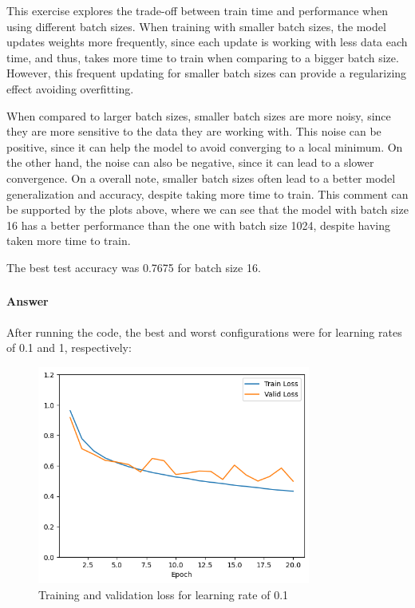 \documentclass{article}
\begin{document}
This exercise explores the trade-off between train time and performance when using different batch sizes. When training with smaller batch sizes, 
the model updates weights more frequently, since each update is working with less data each time, and thus, takes more time to train 
when comparing to a bigger batch size. However, this frequent updating for smaller batch sizes can provide a regularizing effect avoiding overfitting. 

When compared to larger batch sizes, smaller batch sizes are more noisy, since they are more sensitive to the data they are working with. 
This noise can be positive, since it can help the model to avoid converging to a local minimum. On the other hand, the noise can also be negative, 
since it can lead to a slower convergence. On a overall note, smaller batch sizes often lead to a better model generalization and accuracy, 
despite taking more time to train. This comment can be supported by the plots above, where we can see that the model with batch size 16 
has a better performance than the one with batch size 1024, despite having taken more time to train.

The best test accuracy was 0.7675 for batch size 16.

\subsubsection{}
\paragraph{Answer} After running the code, the best and worst configurations were for learning rates of 0.1 and 1, respectively:

\begin{figure}[H]
    \centering
    \includegraphics[width=0.8\textwidth]{"plots/mlp-training-loss-batch-16-lr-0.1-epochs-20-hidden-200-dropout-0.0-l2-0-layers-2-act-relu-opt-sgd.png"}
    \caption{Training and validation loss for learning rate of 0.1}
    \label{2.2b learning rate 0.1}
\end{figure}
\end{document}
